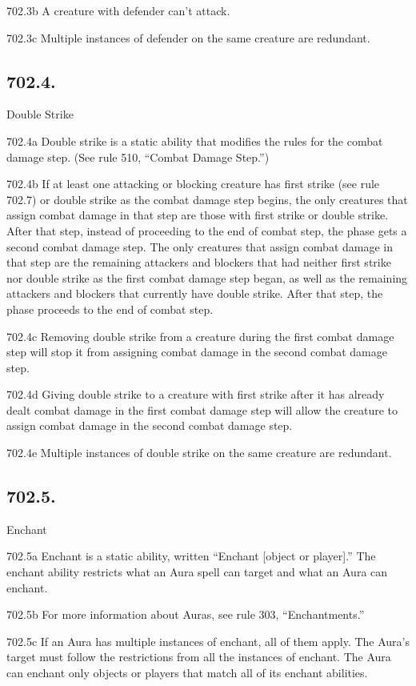 702.3b A creature with defender can’t attack.

702.3c Multiple instances of defender on the same creature are redundant.

\subsection*{702.4.}
Double Strike

702.4a Double strike is a static ability that modifies the rules for the combat damage step. (See rule 510, “Combat Damage Step.”)

702.4b If at least one attacking or blocking creature has first strike (see rule 702.7) or double strike as the combat damage step begins, the only creatures that assign combat damage in that step are those with first strike or double strike. After that step, instead of proceeding to the end of combat step, the phase gets a second combat damage step. The only creatures that assign combat damage in that step are the remaining attackers and blockers that had neither first strike nor double strike as the first combat damage step began, as well as the remaining attackers and blockers that currently have double strike. After that step, the phase proceeds to the end of combat step.

702.4c Removing double strike from a creature during the first combat damage step will stop it from assigning combat damage in the second combat damage step.

702.4d Giving double strike to a creature with first strike after it has already dealt combat damage in the first combat damage step will allow the creature to assign combat damage in the second combat damage step.

702.4e Multiple instances of double strike on the same creature are redundant.

\subsection*{702.5.}
Enchant

702.5a Enchant is a static ability, written “Enchant [object or player].” The enchant ability restricts what an Aura spell can target and what an Aura can enchant.

702.5b For more information about Auras, see rule 303, “Enchantments.”

702.5c If an Aura has multiple instances of enchant, all of them apply. The Aura’s target must follow the restrictions from all the instances of enchant. The Aura can enchant only objects or players that match all of its enchant abilities.

